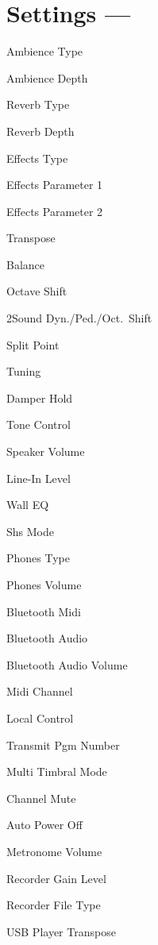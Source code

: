 \section[Settings]{Settings --- \UiKey{\SET}}

Ambience Type


Ambience Depth

Reverb Type


Reverb Depth

Effects Type

Effects Parameter 1


Effects Parameter 2

Transpose


Balance

Octave Shift

2Sound Dyn./Ped./Oct.\ Shift


Split Point




Tuning

Damper Hold

Tone Control


Speaker Volume

Line-In Level


Wall EQ

Shs Mode

Phones Type


Phones Volume

Bluetooth Midi


Bluetooth Audio

Bluetooth Audio Volume

Midi Channel


Local Control

Transmit Pgm Number


Multi Timbral Mode

Channel Mute

Auto Power Off


Metronome Volume

Recorder Gain Level


Recorder File Type

USB Player Transpose

